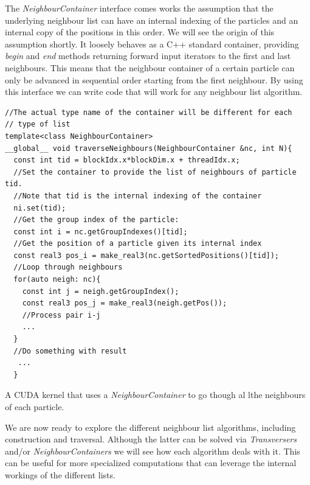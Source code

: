 \documentclass[ twoside,openright,titlepage,numbers=noenddot,%
headinclude,footinclude,cleardoublepage=empty,abstract=on,
BCOR=5mm,paper=a4,fontsize=11pt, dvipsnames
]{scrreprt}
\begin{document}
The \emph{NeighbourContainer} interface comes works the assumption that the underlying neighbour list can have an internal indexing of the particles and an internal copy of the positions in this order. We will see the origin of this assumption shortly.
It loosely behaves as a C++ standard container, providing \emph{begin} and \emph{end} methods returning forward input iterators to the first and last neighbours. This means that the neighbour container of a certain particle can only be advanced in sequential order starting from the first neighbour.
By using this interface we can write code that will work for any neighbour list algorithm.

\begin{listing}
\begin{verbatim}
//The actual type name of the container will be different for each
// type of list
template<class NeighbourContainer>
__global__ void traverseNeighbours(NeighbourContainer &nc, int N){
  const int tid = blockIdx.x*blockDim.x + threadIdx.x;
  //Set the container to provide the list of neighbours of particle tid.
  //Note that tid is the internal indexing of the container
  ni.set(tid);
  //Get the group index of the particle:
  const int i = nc.getGroupIndexes()[tid];
  //Get the position of a particle given its internal index
  const real3 pos_i = make_real3(nc.getSortedPositions()[tid]);  
  //Loop through neighbours
  for(auto neigh: nc){
    const int j = neigh.getGroupIndex();
    const real3 pos_j = make_real3(neigh.getPos());
    //Process pair i-j
    ...
  }
  //Do something with result
   ...
  }
\end{verbatim}
\caption{A CUDA kernel that uses a \emph{NeighbourContainer} to go though al lthe neighbours of each particle.}
\label{code:ncontainer}
\end{listing}

We are now ready to explore the different neighbour list algorithms, including construction and traversal. Although the latter can be solved via \emph{Transversers} and/or \emph{NeighbourContainers} we will see how each algorithm deals with it. This can be useful for more specialized computations that can leverage the internal workings of the different lists.
\end{document}
